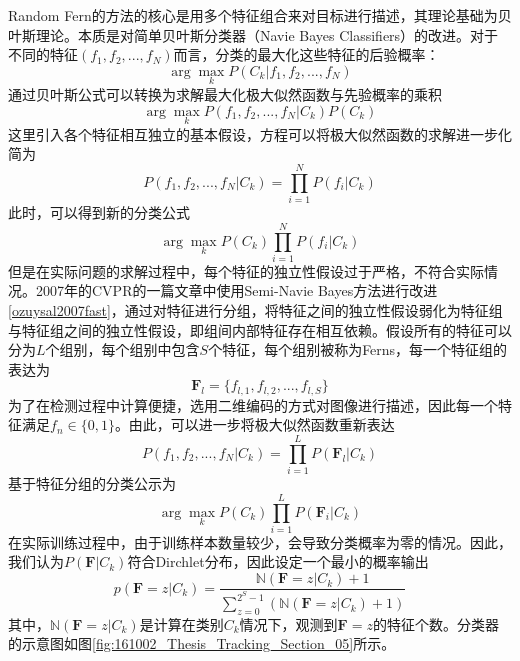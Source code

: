 Random Fern的方法的核心是用多个特征组合来对目标进行描述，其理论基础为贝叶斯理论。本质是对简单贝叶斯分类器（Navie Bayes Classifiers）的改进。对于不同的特征$(f_1, f_2, ..., f_N)$而言，分类的最大化这些特征的后验概率：
\begin{equation}
\arg \max_{k}P(C_k|f_1, f_2, ..., f_N)
\end{equation}
通过贝叶斯公式可以转换为求解最大化极大似然函数与先验概率的乘积
\begin{equation}
\arg \max_{k}P(f_1, f_2, ..., f_N|C_k)P(C_k)
\end{equation}
这里引入各个特征相互独立的基本假设，方程可以将极大似然函数的求解进一步化简为
\begin{equation}
P(f_1, f_2, ..., f_N|C_k)=\prod\limits_{i=1}^{N}P(f_i|C_k)
\end{equation}
此时，可以得到新的分类公式
\begin{equation}
\arg\max_kP(C_k)\prod\limits_{i=1}^{N}P(f_i|C_k)
\end{equation}
但是在实际问题的求解过程中，每个特征的独立性假设过于严格，不符合实际情况。2007年的CVPR的一篇文章中使用Semi-Navie Bayes方法进行改进\ref{ozuysal2007fast}，通过对特征进行分组，将特征之间的独立性假设弱化为特征组与特征组之间的独立性假设，即组间内部特征存在相互依赖。假设所有的特征可以分为$L$个组别，每个组别中包含$S$个特征，每个组别被称为Ferns，每一个特征组的表达为
\begin{equation}
\mathbf{F}_l=\{f_{l,1}, f_{l,2},..., f_{l,S}\}
\end{equation}
为了在检测过程中计算便捷，选用二维编码的方式对图像进行描述，因此每一个特征满足$f_n\in\{{0,1}\}$。由此，可以进一步将极大似然函数重新表达
\begin{equation}
P(f_1, f_2, ..., f_N|C_k)=\prod\limits_{i=1}^{L}P(\mathbf{F}_l|C_k)
\end{equation}
基于特征分组的分类公示为
\begin{equation}
\arg\max_kP(C_k)\prod\limits_{i=1}^{L}P(\mathbf{F}_i|C_k)
\end{equation}
在实际训练过程中，由于训练样本数量较少，会导致分类概率为零的情况。因此，我们认为$P(\mathbf{F}|C_k)$符合Dirchlet分布，因此设定一个最小的概率输出
\begin{equation}
p(\mathbf{F}=z|C_k)=\frac{\mathbb{N}(\mathbf{F}=z|C_k)+1}{\sum_{z=0}^{2^S-1}(\mathbb{N}(\mathbf{F}=z|C_k)+1)}
\end{equation}
其中，$\mathbb{N}(\mathbf{F}=z|C_k)$是计算在类别$C_k$情况下，观测到$\mathbf{F}=z$的特征个数。分类器的示意图如图\ref{fig:161002_Thesis_Tracking_Section_05}所示。
